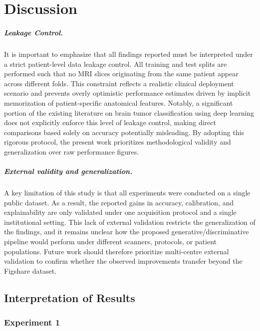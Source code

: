\chapter{Discussion}

\paragraph{Leakage Control.}
It is important to emphasize that all findings reported must be interpreted under a strict patient-level data leakage control. All training and test splits are performed such that no MRI slices originating from the same patient appear across different folds. This constraint reflects a realistic clinical deployment scenario and prevents overly optimistic performance estimates driven by implicit memorization of patient-specific anatomical features. Notably, a significant portion of the existing literature on brain tumor classification using deep learning does not explicitly enforce this level of leakage control, making direct comparisons based solely on accuracy potentially misleading. By adopting this rigorous protocol, the present work prioritizes methodological validity and generalization over raw performance figures.

\paragraph{External validity and generalization.}
A key limitation of this study is that all experiments were conducted on a single public dataset. As a result, the reported gains in accuracy, calibration, and explainability are only validated under one acquisition protocol and a single institutional setting. This lack of external validation restricts the generalization of the findings, and it remains unclear how the proposed generative/discriminative pipeline would perform under different scanners, protocols, or patient populations. Future work should therefore prioritize multi-centre external validation to confirm whether the observed improvements transfer beyond the Figshare dataset.




\section{Interpretation of Results}


\subsection{Experiment 1}

